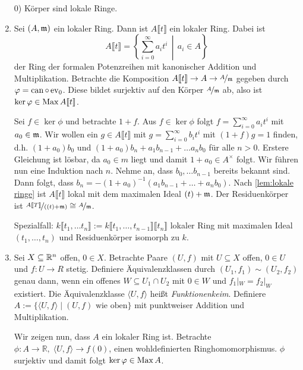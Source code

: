 \documentclass[12pt,a4paper]{scrartcl}
\theoremstyle{cplain}
\theoremstyle{cdef}
\begin{document}
\begin{bsp}
	\begin{enumerate}
        \leavevmode
		\item[0)] Körper sind lokale Ringe.
        \item Sei $(A,\mathfrak{m})$ ein lokaler Ring. Dann ist $A\llbracket t \rrbracket$ ein lokaler Ring. Dabei ist \[ A\llbracket t \rrbracket=\left\{\sum_{i=0}^\infty a_it^i \,\middle|\, a_i \in A\right\} \] der Ring der formalen Potenzreihen mit kanonischer Addition und Multiplikation. Betrachte die Komposition $A\llbracket t \rrbracket \to A \to \nicefrac{A}{\mathfrak{m}}$ gegeben durch $\varphi=\operatorname{can} \circ \operatorname{ev}_0$. Diese bildet surjektiv auf den Körper $\nicefrac{A}{\mathfrak{m}}$ ab, also ist $\operatorname{ker} \varphi \in \operatorname{Max} A\llbracket t \rrbracket$.
        
        Sei $f \in \ker \phi$ und betrachte $1+ f$. Aus $f \in \ker \phi$ folgt $f=\sum_{i=0}^\infty a_it^i$ mit $a_0 \in \mathfrak{m}$. Wir wollen ein $g \in A\llbracket t\rrbracket$ mit $g=\sum_{i=0}^\infty b_it^i$ mit $(1+f)g=1$ finden, d.h. $(1+a_0)b_0$ und $(1+a_0)b_n+a_1b_{n-1}+\dots a_nb_0$ für alle $n > 0$. Erstere Gleichung ist lösbar, da $a_0 \in m$ liegt und damit $1+a_0 \in A^{\times}$ folgt. Wir führen nun eine Induktion nach $n$. Nehme an, dass $b_0, \dots b_{n-1}$ bereits bekannt sind. Dann folgt, dass $b_n=-(1+a_0)^{-1}(a_1b_{n-1}+\dots+a_nb_0)$. Nach \cref{lem:lokale ringe} ist $A\llbracket t \rrbracket$ lokal mit dem maximalen Ideal $(t)+\mathfrak{m}$. Der Residuenkörper ist $\nicefrac{A\llbracket T\rrbracket}{((t)+\mathfrak{m})} \cong \nicefrac{A}{\mathfrak{m}}$.

        Spezialfall: $k\llbracket t_1,\dots t_n\rrbracket := k\llbracket t_1,\dots,t_{n-1}\rrbracket\llbracket t_n\rrbracket$ lokaler Ring mit maximalen Ideal $(t_1,\dots,t_n)$ und Residuenkörper isomorph zu $k$.
        
		\item Sei $X \subseteq \mathbb R^n$ offen, $0 \in X$. Betrachte Paare $(U,f)$ mit $U \subseteq X$ offen, $0 \in U$ und $f:U \to R$ stetig. Definiere Äquivalenzklassen durch $(U_1,f_1) \sim (U_2,f_2)$ genau dann, wenn ein offenes $W \subseteq U_1 \cap U_2$ mit $0 \in W$ und $f_1|_W=f_2|_W$ existiert. Die Äquivalenzklasse $\langle U,f \rangle$ heißt \emph{Funktionenkeim}. Definiere $A := \{\langle U,f \rangle \mid (U,f) \text{ wie oben}\}$ mit  punktweiser Addition und Multiplikation.

		Wir zeigen nun, dass $A$ ein lokaler Ring ist. Betrachte $\phi: A \to \mathbb{R}, \; \langle U,f \rangle \to f(0)$, einen wohldefinierten Ringhomomorphismus. $\phi$ surjektiv und damit folgt $\operatorname{ker} \varphi \in \operatorname{Max} A$.


\end{enumerate}
\end{bsp}
\end{document}
